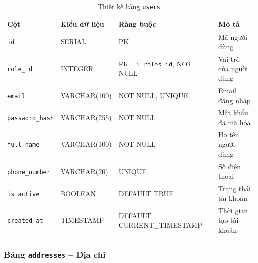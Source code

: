\begin{table}[H]
\centering
\caption{Thiết kế bảng \texttt{users}}
\begin{tabularx}{\textwidth}{|l|l|Z|Z|}
\hline
\textbf{Cột} &
\textbf{Kiểu dữ liệu} &
\textbf{Ràng buộc} &
\textbf{Mô tả} \\ \hline

\texttt{id}
& SERIAL
& PK
& Mã người dùng \\ \hline

\texttt{role\_id}
& INTEGER
& FK $\rightarrow$ \texttt{roles.id}, NOT NULL
& Vai trò của người dùng \\ \hline

\texttt{email}
& VARCHAR(100)
& NOT NULL, UNIQUE
& Email đăng nhập \\ \hline

\texttt{password\_hash}
& VARCHAR(255)
& NOT NULL
& Mật khẩu đã mã hóa \\ \hline

\texttt{full\_name}
& VARCHAR(100)
& NOT NULL
& Họ tên người dùng \\ \hline

\texttt{phone\_number}
& VARCHAR(20)
& UNIQUE
& Số điện thoại \\ \hline

\texttt{is\_active}
& BOOLEAN
& DEFAULT TRUE
& Trạng thái tài khoản \\ \hline

\texttt{created\_at}
& TIMESTAMP
& DEFAULT CURRENT\_TIMESTAMP
& Thời gian tạo tài khoản \\ \hline

\end{tabularx}
\end{table}



\subsubsection{Bảng \texttt{addresses} -- Địa chỉ}

